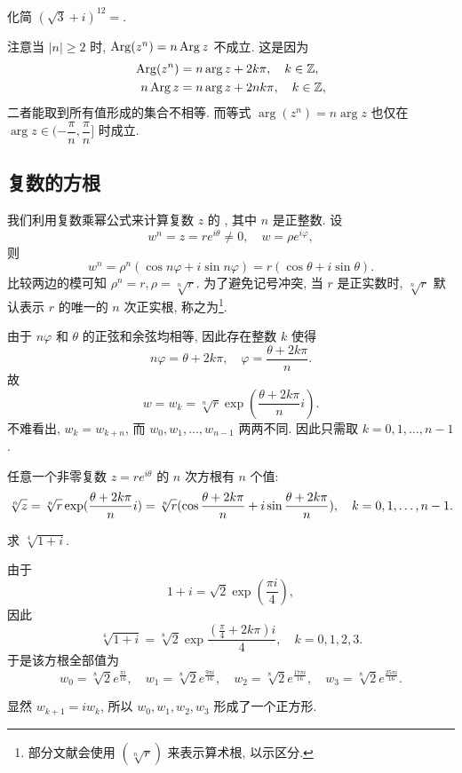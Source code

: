 \begin{exercise}
  化简 $(\sqrt3+i)^{12}=$\fillblank[6em]{}.
\end{exercise}

注意当 $|n|\ge 2$ 时, \alert{$\operatorname{Arg}(z^n)=n\operatorname{Arg} z$ 不成立}.
这是因为
\begin{align*}
  \operatorname{Arg}(z^n)&=n\arg z+2k\pi,\quad k\in{\mathbb{Z}},\\
  n\operatorname{Arg} z&=n\arg z+2nk\pi,\quad k\in{\mathbb{Z}},
\end{align*}
二者能取到所有值形成的集合不相等.
而等式 $\arg(z^n)=n\arg z$ 也仅在 $\arg z\in(-\dfrac{\pi}n,\dfrac\pi n]$ 时成立.

\subsection{复数的方根}

我们利用复数乘幂公式来计算复数 $z$ 的 , 其中 $n$ 是正整数.
设
\[
  w^n=z=re^{i\theta}\neq0,\quad w=\rho e^{i\varphi},
\]
则
\[
  w^n=\rho^n(\cos{n\varphi}+i\sin{n\varphi})
      =r(\cos\theta+i\sin\theta).
\]
比较两边的模可知 $\rho^n=r,\rho=\sqrt[n]r$.
为了避免记号冲突, 当 $r$ 是正实数时, $\sqrt[n]r$ 默认表示 $r$ 的唯一的 $n$ 次正实根, 称之为\footnote{%
  部分文献会使用 $(\sqrt[n]r)$ 来表示算术根, 以示区分.%
}.

由于 $n\varphi$ 和 $\theta$ 的正弦和余弦均相等, 因此存在整数 $k$ 使得
\[
  n\varphi=\theta+2k\pi,\quad \varphi=\frac{\theta+2k\pi}n.
\]
故
\[
  w=w_k=\sqrt[n]r\exp(\dfrac{\theta+2k\pi}ni).
\]
不难看出, $w_k=w_{k+n}$, 而 $w_0,w_1,\dots,w_{n-1}$ 两两不同.
因此只需取 $k=0,1,\dots,n-1$.
\begin{theorem}\label{thm:root}
  任意一个非零复数 $z=re^{i\theta}$ 的 $n$ 次方根有 $n$ 个值:
  \[
    \sqrt[n]z=\sqrt[n]r\exp(\dfrac{\theta+2k\pi}ni)\\
      =\sqrt[n]r(\cos\frac{\theta+2k\pi}n+i\sin\frac{\theta+2k\pi}n),\quad k=0,1,\dots,n-1.
  \]
\end{theorem}

\begin{example}
  求 $\sqrt[4]{1+i}$.
\end{example}

\begin{solution}
  由于
    \[1+i=\sqrt2\exp(\dfrac{\pi i}4),\]
  因此
    \[\sqrt[4]{1+i}=\sqrt[8]2\exp\frac{(\frac\pi4+2k\pi)i}4,\quad k=0,1,2,3.\]
  于是该方根全部值为
    \[w_0=\sqrt[8]2e^{\frac{\pi i}{16}},\quad
    w_1=\sqrt[8]2e^{\frac{9\pi i}{16}},\quad
    w_2=\sqrt[8]2e^{\frac{17\pi i}{16}},\quad
    w_3=\sqrt[8]2e^{\frac{25\pi i}{16}}.\]
\end{solution}
显然 $w_{k+1}=iw_k$,
所以 $w_0,w_1,w_2,w_3$ 形成了一个正方形.

